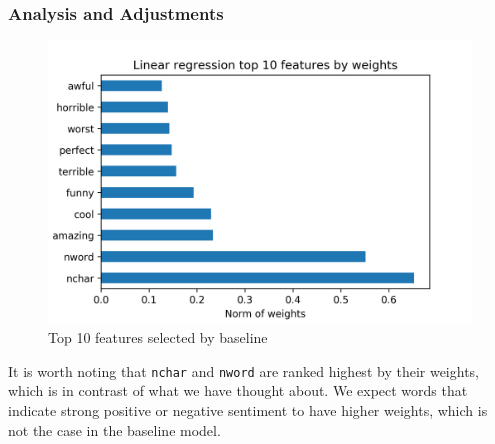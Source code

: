 \documentclass{article}
\begin{document}
\subsubsection{Analysis and Adjustments}
\begin{figure}
\begin{center}
\includegraphics[scale=0.6]{top_10_linear}
\caption{Top 10 features selected by baseline}
\end{center}
\end{figure}
It is worth noting that \texttt{nchar} and \texttt{nword} are ranked highest by
their weights, which is in contrast of what we have thought about. We 
expect words that indicate strong positive or negative sentiment to have
higher weights, which is not the case in the baseline model. \\
\end{document}
